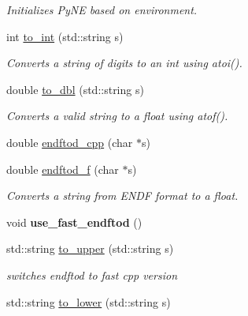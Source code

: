 \begin{DoxyCompactItemize}
\begin{DoxyCompactList}\small\item\em Initializes Py\+N\+E based on environment. \end{DoxyCompactList}\item 
\hypertarget{namespacepyne_ac3037fd5c966b2b515bbbcb0ee56e97a}{int \hyperlink{namespacepyne_ac3037fd5c966b2b515bbbcb0ee56e97a}{to\+\_\+int} (std\+::string s)}\label{namespacepyne_ac3037fd5c966b2b515bbbcb0ee56e97a}

\begin{DoxyCompactList}\small\item\em Converts a string of digits to an int using atoi(). \end{DoxyCompactList}\item 
\hypertarget{namespacepyne_a621b34e474bc505d63aa5c4d7b0ea568}{double \hyperlink{namespacepyne_a621b34e474bc505d63aa5c4d7b0ea568}{to\+\_\+dbl} (std\+::string s)}\label{namespacepyne_a621b34e474bc505d63aa5c4d7b0ea568}

\begin{DoxyCompactList}\small\item\em Converts a valid string to a float using atof(). \end{DoxyCompactList}\item 
double \hyperlink{namespacepyne_a45f290823266c99c35b7b84516087de0}{endftod\+\_\+cpp} (char $\ast$s)
\item 
\hypertarget{namespacepyne_a14e300f1e589b42aaa451bc3cf4c70b8}{double \hyperlink{namespacepyne_a14e300f1e589b42aaa451bc3cf4c70b8}{endftod\+\_\+f} (char $\ast$s)}\label{namespacepyne_a14e300f1e589b42aaa451bc3cf4c70b8}

\begin{DoxyCompactList}\small\item\em Converts a string from E\+N\+D\+F format to a float. \end{DoxyCompactList}\item 
\hypertarget{namespacepyne_a314ad855be2083a69c8c807b137466ac}{void {\bfseries use\+\_\+fast\+\_\+endftod} ()}\label{namespacepyne_a314ad855be2083a69c8c807b137466ac}

\item 
std\+::string \hyperlink{namespacepyne_aa02f7d3ceda305d11379f2f778e4d645}{to\+\_\+upper} (std\+::string s)
\begin{DoxyCompactList}\small\item\em switches endftod to fast cpp version \end{DoxyCompactList}\item 
\hypertarget{namespacepyne_ad694bbfebcefbdb2839ed156ab216abc}{std\+::string \hyperlink{namespacepyne_ad694bbfebcefbdb2839ed156ab216abc}{to\+\_\+lower} (std\+::string s)}\label{namespacepyne_ad694bbfebcefbdb2839ed156ab216abc}


\end{DoxyCompactItemize}
